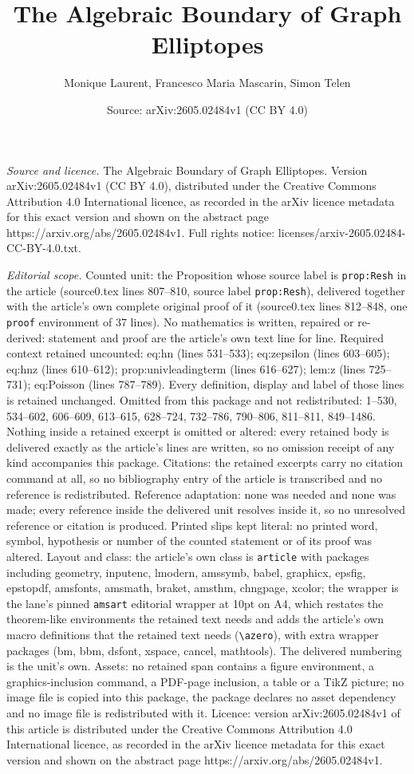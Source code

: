 \documentclass[10pt,a4paper]{amsart}
\title[The Algebraic Boundary of Graph Elliptopes]{The Algebraic Boundary of Graph Elliptopes}
\author{Monique Laurent, Francesco Maria Mascarin, Simon Telen}
\date{Source: arXiv:2605.02484v1 (CC BY 4.0)}
\begin{document}
\maketitle

\noindent\emph{Source and licence.} The Algebraic Boundary of Graph Elliptopes. Version arXiv:2605.02484v1 (CC BY 4.0), distributed under the Creative Commons Attribution 4.0 International licence, as recorded in the arXiv licence metadata for this exact version and shown on the abstract page https://arxiv.org/abs/2605.02484v1. Full rights notice: licenses/arxiv-2605.02484-CC-BY-4.0.txt.\par\smallskip

\noindent\textit{Editorial scope.} Counted unit: the Proposition whose source label is \texttt{prop:Resh} in the article (source0.tex lines 807--810, source label \texttt{prop:Resh}), delivered together with the article's own complete original proof of it (source0.tex lines 812--848, one \texttt{proof} environment of 37 lines). No mathematics is written, repaired or re-derived: statement and proof are the article's own text line for line. Required context retained uncounted: eq:hn (lines 531--533); eq:zepsilon (lines 603--605); eq:hnz (lines 610--612); prop:univleadingterm (lines 616--627); lem:z (lines 725--731); eq:Poisson (lines 787--789). Every definition, display and label of those lines is retained unchanged. Omitted from this package and not redistributed: 1--530, 534--602, 606--609, 613--615, 628--724, 732--786, 790--806, 811--811, 849--1486. Nothing inside a retained excerpt is omitted or altered: every retained body is delivered exactly as the article's lines are written, so no omission receipt of any kind accompanies this package. Citations: the retained excerpts carry no citation command at all, so no bibliography entry of the article is transcribed and no reference is redistributed. Reference adaptation: none was needed and none was made; every reference inside the delivered unit resolves inside it, so no unresolved reference or citation is produced. Printed slips kept literal: no printed word, symbol, hypothesis or number of the counted statement or of its proof was altered. Layout and class: the article's own class is \texttt{article} with packages including geometry, inputenc, lmodern, amssymb, babel, graphicx, epsfig, epstopdf, amsfonts, amsmath, braket, amsthm, chngpage, xcolor; the wrapper is the lane's pinned \texttt{amsart} editorial wrapper at 10pt on A4, which restates the theorem-like environments the retained text needs and adds the article's own macro definitions that the retained text needs (\texttt{\textbackslash azero}), with extra wrapper packages (bm, bbm, dsfont, xspace, cancel, mathtools). The delivered numbering is the unit's own. Assets: no retained span contains a figure environment, a graphics-inclusion command, a PDF-page inclusion, a table or a TikZ picture; no image file is copied into this package, the package declares no asset dependency and no image file is redistributed with it. Licence: version arXiv:2605.02484v1 of this article is distributed under the Creative Commons Attribution 4.0 International licence, as recorded in the arXiv licence metadata for this exact version and shown on the abstract page https://arxiv.org/abs/2605.02484v1. 
\end{document}
